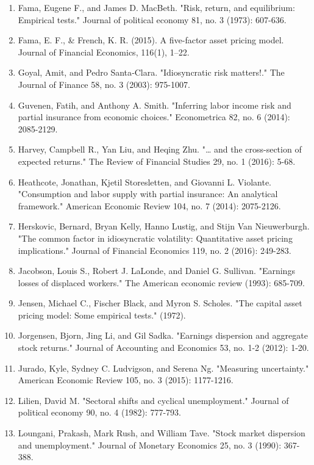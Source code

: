 \documentclass[12pt]{article}
\begin{document}
\begin{enumerate}
    \item {Fama, Eugene F., and James D. MacBeth. "Risk, return, and equilibrium: Empirical tests." Journal of political economy 81, no. 3 (1973): 607-636.}
    \item {Fama, E. F., \& French, K. R. (2015). A five-factor asset pricing model. Journal of Financial Economics, 116(1), 1–22. }
    \item{Goyal, Amit, and Pedro Santa‐Clara. "Idiosyncratic risk matters!." The Journal of Finance 58, no. 3 (2003): 975-1007.}
    \item{Guvenen, Fatih, and Anthony A. Smith. "Inferring labor income risk and partial insurance from economic choices." Econometrica 82, no. 6 (2014): 2085-2129.}
    \item {Harvey, Campbell R., Yan Liu, and Heqing Zhu. "… and the cross-section of expected returns." The Review of Financial Studies 29, no. 1 (2016): 5-68.}
    \item{Heathcote, Jonathan, Kjetil Storesletten, and Giovanni L. Violante. "Consumption and labor supply with partial insurance: An analytical framework." American Economic Review 104, no. 7 (2014): 2075-2126.}
    \item{Herskovic, Bernard, Bryan Kelly, Hanno Lustig, and Stijn Van Nieuwerburgh. "The common factor in idiosyncratic volatility: Quantitative asset pricing implications." Journal of Financial Economics 119, no. 2 (2016): 249-283.}
    \item{Jacobson, Louis S., Robert J. LaLonde, and Daniel G. Sullivan. "Earnings losses of displaced workers." The American economic review (1993): 685-709.}
    \item {Jensen, Michael C., Fischer Black, and Myron S. Scholes. "The capital asset pricing model: Some empirical tests." (1972).}
    \item{Jorgensen, Bjorn, Jing Li, and Gil Sadka. "Earnings dispersion and aggregate stock returns." Journal of Accounting and Economics 53, no. 1-2 (2012): 1-20.}
    \item{Jurado, Kyle, Sydney C. Ludvigson, and Serena Ng. "Measuring uncertainty." American Economic Review 105, no. 3 (2015): 1177-1216.}
    \item{Lilien, David M. "Sectoral shifts and cyclical unemployment." Journal of political economy 90, no. 4 (1982): 777-793.}
    \item{Loungani, Prakash, Mark Rush, and William Tave. "Stock market dispersion and unemployment." Journal of Monetary Economics 25, no. 3 (1990): 367-388.}

\end{enumerate}
\end{document}
